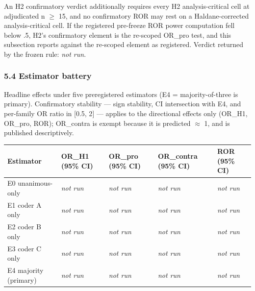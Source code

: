 An H2 confirmatory verdict additionally requires every H2 analysis-critical cell at adjudicated n $\ge$ 15, and no confirmatory ROR may rest on a Haldane-corrected analysis-critical cell. If the registered pre-freeze ROR power computation fell below .5, H2's confirmatory element is the re-scoped OR\_pro test, and this subsection reports against the re-scoped element as registered. Verdict returned by the frozen rule: \emph{not run}.

\subsubsection{5.4 Estimator battery}\label{estimator-battery}

Headline effects under five preregistered estimators (E4 = majority-of-three is primary). Confirmatory stability --- sign stability, CI intersection with E4, and per-family OR ratio in {[}0.5, 2{]} --- applies to the directional effects only (OR\_H1, OR\_pro, ROR); OR\_contra is exempt because it is predicted $\approx$ 1, and is published descriptively.

\begin{longtable}[]{@{}
  >{\raggedright\arraybackslash}p{}
  >{\raggedright\arraybackslash}p{}
  >{\raggedright\arraybackslash}p{}
  >{\raggedright\arraybackslash}p{}
  >{\raggedright\arraybackslash}p{}@{}}
\toprule\noalign{}
\begin{minipage}[b]{\linewidth}\raggedright
Estimator
\end{minipage} & \begin{minipage}[b]{\linewidth}\raggedright
OR\_H1 (95\% CI)
\end{minipage} & \begin{minipage}[b]{\linewidth}\raggedright
OR\_pro (95\% CI)
\end{minipage} & \begin{minipage}[b]{\linewidth}\raggedright
OR\_contra (95\% CI)
\end{minipage} & \begin{minipage}[b]{\linewidth}\raggedright
ROR (95\% CI)
\end{minipage} \\
\midrule\noalign{}
\endhead
\bottomrule\noalign{}
\endlastfoot
E0 unanimous-only & \emph{not run} & \emph{not run} & \emph{not run} & \emph{not run} \\
E1 coder A only & \emph{not run} & \emph{not run} & \emph{not run} & \emph{not run} \\
E2 coder B only & \emph{not run} & \emph{not run} & \emph{not run} & \emph{not run} \\
E3 coder C only & \emph{not run} & \emph{not run} & \emph{not run} & \emph{not run} \\
E4 majority (primary) & \emph{not run} & \emph{not run} & \emph{not run} & \emph{not run} \\
\end{longtable}

